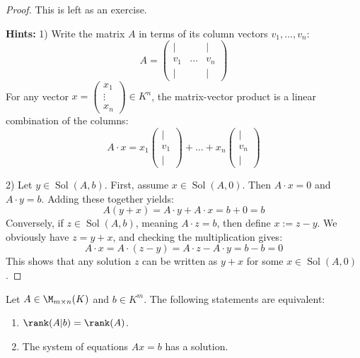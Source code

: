 \begin{proof}
This is left as an exercise.

\textbf{Hints:}
1) Write the matrix $A$ in terms of its column vectors $v_1, \dots, v_n$:
\begin{equation*}
    A = \begin{pmatrix} | & & | \\ v_1 & \dots & v_n \\ | & & | \end{pmatrix}
\end{equation*}
For any vector $x = \begin{pmatrix} x_1 \\ \vdots \\ x_n \end{pmatrix} \in K^n$, the matrix-vector product is a linear combination of the columns:
\begin{equation*}
    A \cdot x = x_1 \begin{pmatrix} | \\ v_1 \\ | \end{pmatrix} + \dots + x_n \begin{pmatrix} | \\ v_n \\ | \end{pmatrix}
\end{equation*}

2) Let $y \in \operatorname{Sol}(A, b)$. First, assume $x \in \operatorname{Sol}(A, 0)$. Then $A \cdot x = 0$ and $A \cdot y = b$. Adding these together yields:
\begin{equation*}
    A(y + x) = A \cdot y + A \cdot x = b + 0 = b
\end{equation*}
Conversely, if $z \in \operatorname{Sol}(A, b)$, meaning $A \cdot z = b$, then define $x := z - y$. We obviously have $z = y + x$, and checking the multiplication gives:
\begin{equation*}
    A \cdot x = A \cdot (z - y) = A \cdot z - A \cdot y = b - b = 0
\end{equation*}
This shows that any solution $z$ can be written as $y + x$ for some $x \in \operatorname{Sol}(A, 0)$.
\end{proof}

\begin{proposition}
\label{prop:rank_solvability_criterion}
Let $A \in \M_{m \times n}(K)$ and $b \in K^m$. The following statements are equivalent:
\begin{enumerate}
    \item $\rank(A|b) = \rank(A)$.
    \item The system of equations $Ax = b$ has a solution.
\end{enumerate}
\end{proposition}

